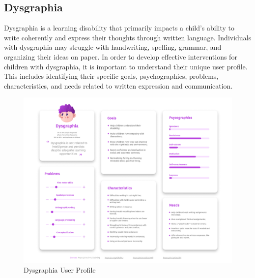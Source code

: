 \subsection{Dysgraphia}
Dysgraphia is a learning disability that primarily impacts a child's ability to write coherently and express their thoughts through written language. Individuals with dysgraphia may struggle with handwriting, spelling, grammar, and organizing their ideas on paper. In order to develop effective interventions for children with dysgraphia, it is important to understand their unique user profile. This includes identifying their specific goals, psychographics, problems, characteristics, and needs related to written expression and communication.

\begin{figure}[H]
    \centering
    \includegraphics[width=0.8\linewidth]{Chapters/figma/Disgrafia.png}
    \caption{Dysgraphia User Profile}
    \label{fig:disgrafiaUserProfile}
\end{figure}

